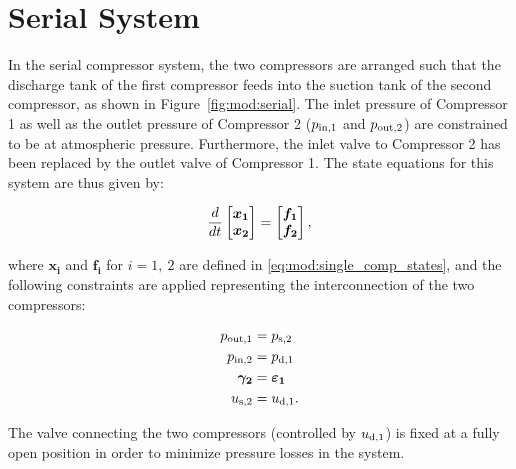\section{Serial System}
\label{sec:mod:serial}

In the serial compressor system, the two compressors are arranged such that the discharge tank of the first compressor feeds into the suction tank of the second compressor, as shown in Figure~\ref{fig:mod:serial}.
The inlet pressure of Compressor 1 as well as the outlet pressure of Compressor 2 ($p_\text{in,1}$ and $p_\text{out,2}$) are constrained to be at atmospheric pressure.
Furthermore, the inlet valve to Compressor 2 has been replaced by the outlet valve of Compressor 1. The state equations for this system are thus given by:

\begin{equation}
  \frac{d}{dt}
  \begin{bmatrix}
    \bm{x_1}\\
    \bm{x_2}\\
  \end{bmatrix} =
  \begin{bmatrix}
    \bm{f_1}\\
    \bm{f_2}
  \end{bmatrix},
  \label{eq:mod:serial-state-eq}
\end{equation}

where $\bm{x_i}$ and $\bm{f_i}$ for $i=1,\ 2$ are defined in \eqref{eq:mod:single_comp_states}, and the following constraints are applied representing the interconnection of the two compressors:

\begin{equation}
  \begin{split}
    p_\text{out,1} & = p_\text{s,2}\\
    p_\text{in,2} & = p_\text{d,1}\\
    \bm{\gamma_2} & = \bm{\varepsilon_1}\\
    u_\text{s,2} & = u_\text{d,1}.
  \end{split}
  \label{eq:mod:serial-constraints}
\end{equation}

The valve connecting the two compressors (controlled by $u_\text{d,1}$) is fixed at a fully open position in order to minimize pressure losses in the system.


